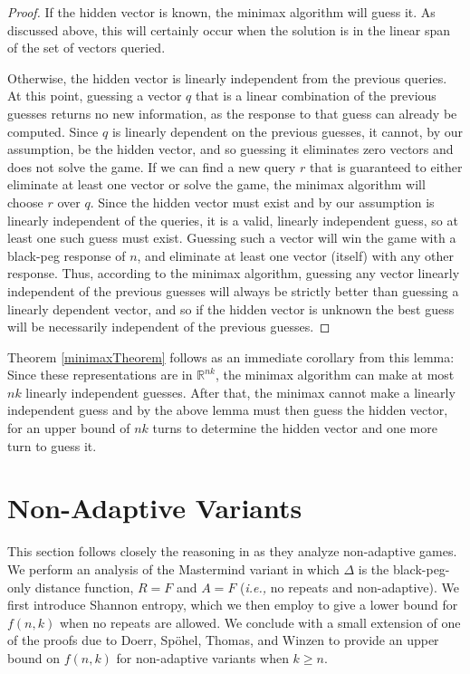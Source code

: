 \documentclass[12pt, a4paper]{article}
\newcommand{\R}{\mathbb{R}}           %
\begin{document}
\begin{proof}
	If the hidden vector is known, the minimax algorithm will guess it. As discussed above, this will certainly occur when the solution is in the linear span of the set of vectors queried.
	
	Otherwise, the hidden vector is linearly independent from the previous queries. At this point, guessing a vector $q$ that is a linear combination of the previous guesses returns no new information, as the response to that guess can already be computed. Since $q$ is linearly dependent on the previous guesses, it cannot, by our assumption, be the hidden vector, and so guessing it eliminates zero vectors and does not solve the game. If we can find a new query $r$ that is guaranteed to either eliminate at least one vector or solve the game, the minimax algorithm will choose $r$ over $q$. Since the hidden vector must exist and by our assumption is linearly independent of the queries, it is a valid, linearly independent guess, so at least one such guess must exist. Guessing such a vector will win the game with a black-peg response of $n$, and eliminate at least one vector (itself) with any other response. Thus, according to the minimax algorithm, guessing any vector linearly independent of the previous guesses will always be strictly better than guessing a linearly dependent vector, and so if the hidden vector is unknown the best guess will be necessarily independent of the previous guesses.
\end{proof}
Theorem \ref{minimaxTheorem} follows as an immediate corollary from this lemma: Since these representations are in $\R^{nk}$, the minimax algorithm can make at most $nk$ linearly independent guesses. After that, the minimax cannot make a linearly independent guess and by the above lemma must then guess the hidden vector, for an upper bound of $nk$ turns to determine the hidden vector and one more turn to guess it.

\section{Non-Adaptive Variants}
This section follows closely the reasoning  in \cite{DS13} as they analyze non-adaptive games.  We perform an analysis of the Mastermind variant in which $\Delta$ is the black-peg-only distance function, $R=F$ and $A=F$ (\textit{i.e.,} no repeats and non-adaptive). We first introduce Shannon entropy, which we then employ to give a lower bound for $f(n,k)$ when no repeats are allowed. We conclude with a small extension of one of the proofs due to Doerr, Sp\"ohel, Thomas, and Winzen to provide an upper bound on $f(n,k)$ for non-adaptive variants when $k\ge n$.
\end{document}
